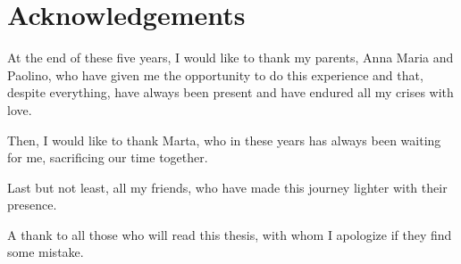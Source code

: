\chapter*{Acknowledgements}

At the end of these five years, I would like to thank my parents, Anna Maria and Paolino, who have given me the opportunity to do this experience and that, despite everything, have always been present and have endured all my crises with love.

Then, I would like to thank Marta, who in these years has always been waiting for me, sacrificing our time together.

Last but not least, all my friends, who have made this journey lighter with their presence.

A thank to all those who will read this thesis, with whom I apologize if they find some mistake.
